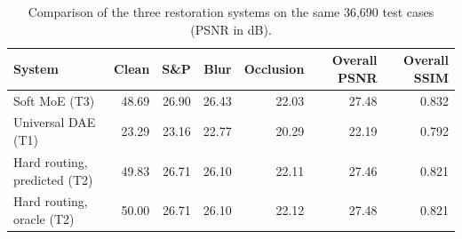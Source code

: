 \begin{table}[t]\centering\caption{Comparison of the three restoration systems on the same 36{,}690 test cases (PSNR in dB).}\label{tab:cmp}
\begin{tabular}{lrrrrrr}\toprule
System & Clean & S\&P & Blur & Occlusion & Overall PSNR & Overall SSIM\\ \midrule
Soft MoE (T3) & 48.69 & 26.90 & 26.43 & 22.03 & 27.48 & 0.832 \\
Universal DAE (T1) & 23.29 & 23.16 & 22.77 & 20.29 & 22.19 & 0.792 \\
Hard routing, predicted (T2) & 49.83 & 26.71 & 26.10 & 22.11 & 27.46 & 0.821 \\
Hard routing, oracle (T2) & 50.00 & 26.71 & 26.10 & 22.12 & 27.48 & 0.821 \\
\bottomrule\end{tabular}\end{table}
